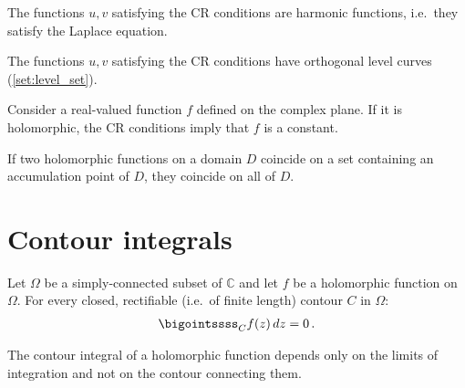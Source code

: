     \begin{property}
        The functions $u,v$ satisfying the CR conditions are harmonic functions, i.e.~they satisfy the Laplace equation.
    \end{property}
    \begin{property}
        The functions $u,v$ satisfying the CR conditions have orthogonal level curves (\cref{set:level_set}).
    \end{property}

    \begin{property}
        Consider a real-valued function $f$ defined on the complex plane. If it is holomorphic, the CR conditions imply that $f$ is a constant.
    \end{property}

    \begin{theorem}
        If two holomorphic functions on a domain $D$ coincide on a set containing an accumulation point of $D$, they coincide on all of $D$.
    \end{theorem}

\section{Contour integrals}



    \begin{theorem}\label{complex:cauchy_integral_theorem}
        Let $\Omega$ be a simply-connected subset of $\mathbb{C}$ and let $f$ be a holomorphic function on $\Omega$. For every closed, rectifiable (i.e.~of finite length) contour $C$ in $\Omega$:
        \begin{gather}
            \bigointssss_Cf(z)\,dz = 0\,.
        \end{gather}
    \end{theorem}
    \begin{result}
        The contour integral of a holomorphic function depends only on the limits of integration and not on the contour connecting them.
    \end{result}

